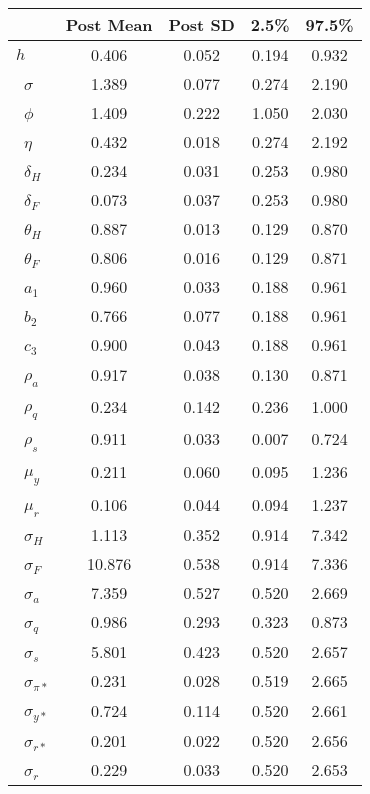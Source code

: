 \begin{tiny}\begin{tabular}{lcccc}
\hline
&\textbf{Post Mean}&\textbf{Post SD}&\textbf{2.5\%}&\textbf{97.5\%}\\\hline
\textbf{$ h             $}&0.406&0.052&0.194&0.932\\\
\textbf{$ \sigma        $}&1.389&0.077&0.274&2.190\\\
\textbf{$ \phi          $}&1.409&0.222&1.050&2.030\\\
\textbf{$ \eta          $}&0.432&0.018&0.274&2.192\\\
\textbf{$ \delta_{H}    $}&0.234&0.031&0.253&0.980\\\
\textbf{$ \delta_{F}    $}&0.073&0.037&0.253&0.980\\\
\textbf{$ \theta_{H}    $}&0.887&0.013&0.129&0.870\\\
\textbf{$ \theta_{F}    $}&0.806&0.016&0.129&0.871\\\
\textbf{$ a_{1}         $}&0.960&0.033&0.188&0.961\\\
\textbf{$ b_{2}         $}&0.766&0.077&0.188&0.961\\\
\textbf{$ c_{3}         $}&0.900&0.043&0.188&0.961\\\
\textbf{$ \rho_{a}      $}&0.917&0.038&0.130&0.871\\\
\textbf{$ \rho_{q}      $}&0.234&0.142&0.236&1.000\\\
\textbf{$ \rho_{s}      $}&0.911&0.033&0.007&0.724\\\
\textbf{$ \mu_{y}       $}&0.211&0.060&0.095&1.236\\\
\textbf{$ \mu_{r}       $}&0.106&0.044&0.094&1.237\\\
\textbf{$ \sigma_{H}    $}&1.113&0.352&0.914&7.342\\\
\textbf{$ \sigma_{F}    $}&10.876&0.538&0.914&7.336\\\
\textbf{$ \sigma_{a}    $}&7.359&0.527&0.520&2.669\\\
\textbf{$ \sigma_{q}    $}&0.986&0.293&0.323&0.873\\\
\textbf{$ \sigma_{s}    $}&5.801&0.423&0.520&2.657\\\
\textbf{$ \sigma_{\pi*} $}&0.231&0.028&0.519&2.665\\\
\textbf{$ \sigma_{y*}   $}&0.724&0.114&0.520&2.661\\\
\textbf{$ \sigma_{r*}   $}&0.201&0.022&0.520&2.656\\\
\textbf{$ \sigma_{r}    $}&0.229&0.033&0.520&2.653\\\hline
\end{tabular}
\end{tiny}